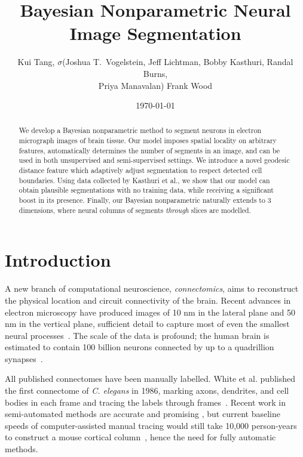 \documentclass[english]{article}
\newcommand{\+}[1]{\ensuremath{\boldsymbol{\mathrm{#1}}}}
\begin{document}
\title{Bayesian Nonparametric Neural Image Segmentation}
\author{Kui Tang, $\sigma$(Joshua T.~Vogelstein, Jeff Lichtman, Bobby Kasthuri, Randal Burns, 
\\ Priya Manavalan) Frank Wood}
\date{\today}
\maketitle
\begin{abstract}
We develop a Bayesian nonparametric method to segment neurons in electron micrograph images of brain tissue. Our model imposes spatial locality on arbitrary features, automatically determines the number of segments in an image, and can be used in both unsupervised and semi-supervised settings. We introduce a novel geodesic distance feature which adaptively adjust segmentation to respect detected cell boundaries. Using data collected by Kasthuri et al., we show that our model can obtain plausible segmentations with no training data, while receiving a significant boost in its presence. Finally, our Bayesian nonparametric naturally extends to 3 dimensions, where neural columns of segments \emph{through} slices are modelled.
\end{abstract}

\section{Introduction}
A new branch of computational neuroscience, \emph{connectomics}, aims to reconstruct the physical location and circuit connectivity of the brain. Recent advances in electron microscopy have produced images of 10 nm in the lateral plane and 50 nm in the vertical plane, sufficient detail to capture most of even the smallest neural processes~\cite{Briggman2006}. The scale of the data is profound; the human brain is estimated to contain 100 billion neurons connected by up to a quadrillion synapses~\cite{Kasthuri2010}.

All published connectomes have been manually labelled. White et al. published the first connectome of \emph{C. elegans} in 1986, marking axons, dendrites, and cell bodies in each frame and tracing the labels through frames~\cite{White12111986}. Recent work in semi-automated methods are accurate and promising \cite{Roberts2011,Unger2009,Jarrell2012,Bock2011}, but current baseline speeds of computer-assisted manual tracing would still take 10,000 person-years to construct a mouse cortical column~\cite{Briggman2006}, hence the need for fully automatic methods.
\end{document}
